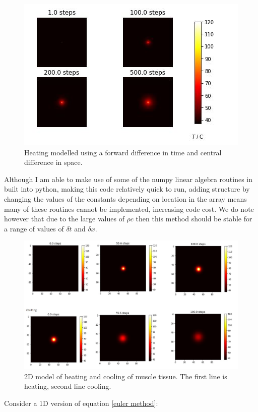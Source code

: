 \documentclass[11pt]{article} %
\begin{document}
\begin{figure}
	\centering
	\includegraphics[width=0.9\linewidth]{Report_images/forward_central_difference}
	\caption{Heating modelled using a forward difference in time and central difference in space.}
	\label{fig:forwardcentraldifference}
\end{figure}

Although I am able to make use of some of the numpy linear algebra routines in built into python, making this code relatively quick to run, adding structure by changing the values of the constants depending on location in the array means many of these routines cannot be implemented, increasing code cost. We do note however that due to the large values of $\rho c$ then this method should be stable for a range of values of $\delta t$ and $\delta x$.

\begin{figure}
	\centering
	\includegraphics[width=\linewidth]{"Report_images/2d_homogenous heating and cooling"}
	\caption{2D model of heating and cooling of muscle tissue. The first line is heating, second line cooling.}
	\label{fig:2dhomogenous-heating-and-cooling}
\end{figure}
Consider a 1D version of equation \ref{euler method}:
\end{document}
